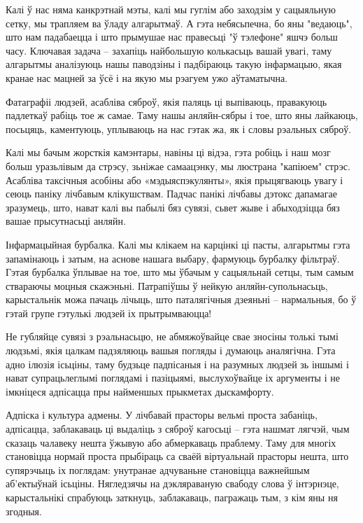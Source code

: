 Калі ў нас няма канкрэтнай мэты, калі мы гуглім або заходзім у сацыяльную сетку, мы трапляем ва ўладу алгарытмаў. А гэта небясьпечна, бо яны "ведаюць", што нам падабаецца і што прымушае нас правесьці "ў тэлефоне" яшчэ больш часу. Ключавая задача – захапіць найбольшую колькасьць вашай увагі, таму алгарытмы аналізуюць нашы паводзіны і падбіраюць такую інфармацыю, якая кранае нас мацней за ўсё і на якую мы рэагуем ужо аўтаматычна.

Фатаграфіі людзей, асабліва сяброў, якія паляць ці выпіваюць, правакуюць падлеткаў рабіць тое ж самае. Таму нашы анляйн-сябры і тое, што яны лайкаюць, посьцяць, каментуюць, уплываюць на нас гэтак жа, як і словы рэальных сяброў.

Калі мы бачым жорсткія камэнтары, навіны ці відэа, гэта робіць і наш мозг больш уразьлівым да стрэсу, зьніжае самаацэнку, мы люстрана "капіюем" стрэс. Асабліва таксічныя асобіны або «мэдыяспэкулянты», якія прыцягваюць увагу і сеюць паніку лічбавым клікушствам. Падчас панікі лічбавы дэтокс дапамагае зразумець, што, нават калі вы пабылі бяз сувязі, сьвет жыве і абыходзіцца бяз вашае прысутнасьці анляйн.

Інфармацыйная бурбалка. Калі мы клікаем на карцінкі ці пасты, алгарытмы гэта запамінаюць і затым, на аснове нашага выбару, фармуюць бурбалку фільтраў. Гэтая бурбалка ўплывае на тое, што мы ўбачым у сацыяльнай сетцы, тым самым ствараючы моцныя скажэньні. Патрапіўшы ў нейкую анляйн-супольнасьць, карыстальнік можа пачаць лічыць, што паталягічныя дзеяньні – нармальныя, бо ў гэтай групе гэтулькі людзей іх прытрымваюцца!

Не губляйце сувязі з рэальнасьцю, не абмяжоўвайце свае зносіны толькі тымі людзьмі, якія цалкам падзяляюць вашыя погляды і думаюць аналягічна. Гэта адно ілюзія ісьціны, таму будзьце падпісаныя і на разумных людзей зь іншымі і нават супрацьлеглымі поглядамі і пазіцыямі, выслухоўвайце іх аргументы і не імкніцеся адпісацца пры найменшых прыкметах дыскамфорту.

Адпіска і культура адмены. У лічбавай прасторы вельмі проста забаніць, адпісацца, заблакаваць ці выдаліць з сяброў кагосьці – гэта нашмат лягчэй, чым сказаць чалавеку нешта ўжывую або абмеркаваць праблему. Таму для многіх становіцца нормай проста прыбіраць са сваёй віртуальнай прасторы нешта, што супярэчыць іх поглядам: унутранае адчуваньне становіцца важнейшым аб'ектыўнай ісьціны. Нягледзячы на дэкляраваную свабоду слова ў інтэрнэце, карыстальнікі спрабуюць заткнуць, заблакаваць, пагражаць тым, з кім яны ня згодныя.

